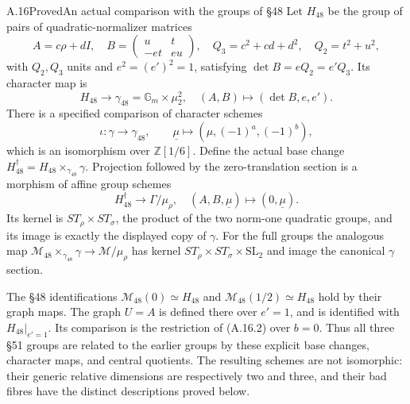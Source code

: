 \begin{statement}{A.16}{Proved}{An actual comparison with the groups of \S48}
Let $H_{48}$ be the group of pairs of quadratic-normalizer matrices
\[
 A=c\rho+dI,\quad
 B=\begin{pmatrix}u&t\\-et&eu\end{pmatrix},\quad
 Q_3=c^2+cd+d^2,\quad Q_2=t^2+u^2,
\]
with $Q_2,Q_3$ units and $e^2=(e')^2=1$, satisfying
$\det B=eQ_2=e'Q_3$. Its character map is
\[
 H_{48}\to\gamma_{48}=\mathbb G_m\times\mu_2^2,
 \quad(A,B)\mapsto(\det B,e,e').
\]
There is a specified comparison of character schemes
\[
 \iota:\gamma\longrightarrow\gamma_{48},\qquad
 \underline\mu\longmapsto(\mu,(-1)^a,(-1)^b),      \tag{A.16.1}
\]
which is an isomorphism over $\mathbb Z[1/6]$. Define the actual
base change $H_{48}^\dagger=H_{48}\times_{\gamma_{48}}\gamma$.
Projection followed by the zero-translation section is a morphism
of affine group schemes
\[
 H_{48}^\dagger\longrightarrow\Gamma/\mu_\rho,
 \quad(A,B,\underline\mu)\longmapsto(0,\underline\mu). \tag{A.16.2}
\]
Its kernel is $ST_\rho\times ST_\sigma$, the product of the two
norm-one quadratic groups, and its image is exactly the displayed
copy of $\gamma$. For the full groups the analogous map
$\mathcal M_{48}\times_{\gamma_{48}}\gamma\to\mathcal M/\mu_\rho$
has kernel $ST_\rho\times ST_\sigma\times\mathrm{SL}_2$ and image
the canonical $\gamma$ section.

The \S48 identifications
$\mathcal M_{48}(0)\simeq H_{48}$ and
$\mathcal M_{48}(1/2)\simeq H_{48}$ hold by their graph maps.
The graph $U=A$ is defined there over $e'=1$, and is identified with
$H_{48}|_{e'=1}$. Its comparison is the restriction of (A.16.2)
over $b=0$. Thus all three \S51 groups are related to the earlier
groups by these explicit base changes, character maps, and central
quotients. The resulting schemes are not isomorphic: their generic
relative dimensions are respectively two and three, and their bad
fibres have the distinct descriptions proved below.
\end{statement}
